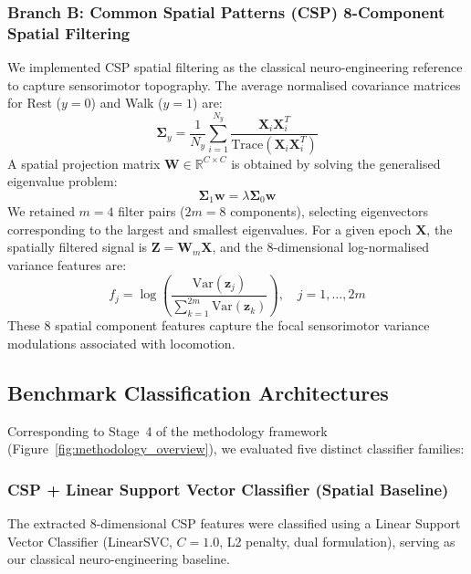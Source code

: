 \documentclass[11pt,a4paper]{article}
\begin{document}
\subsubsection{Branch B: Common Spatial Patterns (CSP) 8-Component Spatial Filtering}
We implemented CSP spatial filtering as the classical neuro-engineering reference \cite{blankertz2008optimizing} to capture sensorimotor topography. The average normalised covariance matrices for Rest ($y=0$) and Walk ($y=1$) are:
\begin{equation}
    \boldsymbol{\Sigma}_y = \frac{1}{N_y} \sum_{i=1}^{N_y} \frac{\mathbf{X}_i \mathbf{X}_i^T}{\text{Trace}(\mathbf{X}_i \mathbf{X}_i^T)}
\end{equation}
A spatial projection matrix $\mathbf{W} \in \mathbb{R}^{C \times C}$ is obtained by solving the generalised eigenvalue problem:
\begin{equation}
    \boldsymbol{\Sigma}_1 \mathbf{w} = \lambda \boldsymbol{\Sigma}_0 \mathbf{w}
\end{equation}
We retained $m = 4$ filter pairs ($2m = 8$ components), selecting eigenvectors corresponding to the largest and smallest eigenvalues. For a given epoch $\mathbf{X}$, the spatially filtered signal is $\mathbf{Z} = \mathbf{W}_m \mathbf{X}$, and the 8-dimensional log-normalised variance features are:
\begin{equation}
    f_j = \log \left( \frac{\text{Var}(\mathbf{z}_j)}{\sum_{k=1}^{2m} \text{Var}(\mathbf{z}_k)} \right), \quad j = 1, \dots, 2m
\end{equation}
These 8 spatial component features capture the focal sensorimotor variance modulations associated with locomotion.

\subsection{Benchmark Classification Architectures}
\label{sec:architectures}

Corresponding to Stage~4 of the methodology framework (Figure~\ref{fig:methodology_overview}), we evaluated five distinct classifier families:

\subsubsection{CSP + Linear Support Vector Classifier (Spatial Baseline)}
The extracted 8-dimensional CSP features were classified using a Linear Support Vector Classifier (LinearSVC, $C=1.0$, L2 penalty, dual formulation), serving as our classical neuro-engineering baseline.
\end{document}

